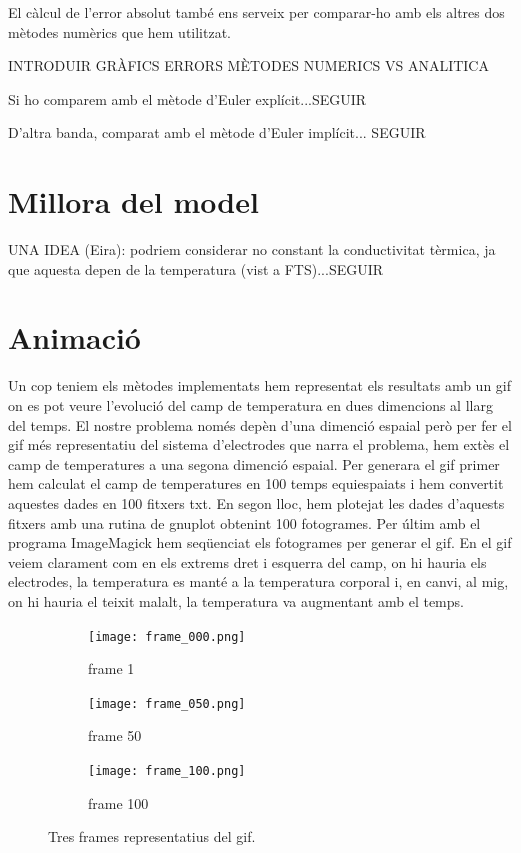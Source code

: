 \documentclass[11pt]{article}
\begin{document}
El càlcul de l'error absolut també ens serveix per comparar-ho amb els altres dos mètodes numèrics que hem utilitzat.

INTRODUIR GRÀFICS ERRORS MÈTODES NUMERICS VS ANALITICA

Si ho comparem amb el mètode d'Euler explícit...SEGUIR

D'altra banda, comparat amb el mètode d'Euler implícit... SEGUIR


\section{Millora del model}

UNA IDEA (Eira): podriem considerar no constant la conductivitat tèrmica, ja que aquesta depen de la temperatura (vist a FTS)...SEGUIR


\section{Animació}
Un cop teniem els mètodes implementats hem representat els resultats amb un gif on es pot veure l'evolució del camp de temperatura en dues dimencions al llarg del temps. El nostre problema només depèn d'una dimenció espaial però per fer el gif més representatiu del sistema d'electrodes que narra el problema, hem extès el camp de temperatures a una segona dimenció espaial. 
Per generara el gif primer hem calculat el camp de temperatures en 100 temps equiespaiats i hem convertit aquestes dades en 100 fitxers txt. En segon lloc, hem plotejat les dades d'aquests fitxers amb una rutina de gnuplot obtenint 100 fotogrames. Per últim amb el programa ImageMagick hem seqüenciat els fotogrames per generar el gif.
En el gif veiem clarament com en els extrems dret i esquerra del camp, on hi hauria els electrodes, la temperatura es manté a la temperatura corporal i, en canvi, al mig, on hi hauria el teixit malalt, la temperatura va augmentant amb el temps.



\begin{figure}[hbt!]
    \centering
    \begin{subfigure}{0.3\textwidth}
        \centering
        \texttt{[image: frame\_000.png]}
        \caption{frame 1}
    \end{subfigure}%
    \hspace{0.001\textwidth}%
    \begin{subfigure}{0.3\textwidth}
        \centering
        \texttt{[image: frame\_050.png]}
        \caption{frame 50}
    \end{subfigure}
    \hspace{0.01\textwidth}
    \begin{subfigure}{0.3\textwidth}
        \centering
        \texttt{[image: frame\_100.png]}
        \caption{frame 100}
    \end{subfigure}

    \caption{Tres frames representatius del gif.}
    \label{fig:dues_imatges}
\end{figure}
\end{document}
